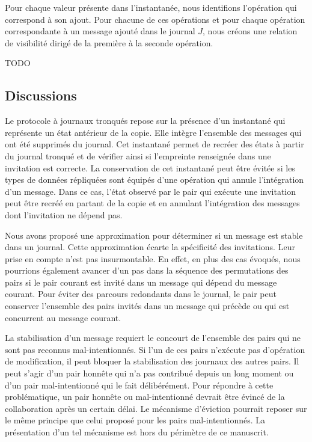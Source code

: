 Pour chaque valeur présente dans l'instantanée, nous identifions l'opération qui correspond à son ajout.
Pour chacune de ces opérations et pour chaque opération correspondante à un message ajouté dans le journal $J$, nous créons une relation de visibilité dirigé de la première à la seconde opération.

TODO


\subsection{Discussions}

Le protocole à journaux tronqués repose sur la présence d'un instantané qui représente un état antérieur de la copie.
Elle intègre l'ensemble des messages qui ont été supprimés du journal.
Cet instantané permet de recréer des états à partir du journal tronqué et de vérifier ainsi si l'empreinte renseignée dans une invitation est correcte.
La conservation de cet instantané peut être évitée si les types de données répliquées sont équipés d'une opération qui annule l'intégration d'un message.
Dans ce cas, l'état observé par le pair qui exécute une invitation peut être recréé en partant de la copie et en annulant l'intégration des messages dont l'invitation ne dépend pas.

Nous avons proposé une approximation pour déterminer si un message est stable dans un journal.
Cette approximation écarte la spécificité des invitations.
Leur prise en compte n'est pas insurmontable.
En effet, en plus des cas évoqués, nous pourrions également avancer d'un pas dans la séquence des permutations des pairs si le pair courant est invité dans un message qui dépend du message courant.
Pour éviter des parcours redondants dans le journal, le pair peut conserver l'ensemble des pairs invités dans un message qui précède ou qui est concurrent au message courant.

La stabilisation d'un message requiert le concourt de l'ensemble des pairs qui ne sont pas reconnus mal-intentionnés.
Si l'un de ces pairs n'exécute pas d'opération de modification, il peut bloquer la stabilisation des journaux des autres pairs.
Il peut s'agir d'un pair honnête qui n'a pas contribué depuis un long moment ou d'un pair mal-intentionné qui le fait délibérément.
Pour répondre à cette problématique, un pair honnête ou mal-intentionné devrait être évincé de la collaboration après un certain délai.
Le mécanisme d'éviction pourrait reposer sur le même principe que celui proposé pour les pairs mal-intentionnés.
La présentation d'un tel mécanisme est hors du périmètre de ce manuscrit.


